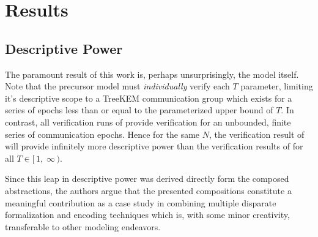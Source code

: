 \documentclass[authordraft,sigconf]{acmart}
\newcommand{\NumericRangeOpenR}[2]{\ensuremath{[\,#1,\; #2\,)}\xspace}
\begin{document}
\section{Results}

\subsection{Descriptive Power\label{sec:descriptive-power}}

The paramount result of this work is, perhaps unsurprisingly, the model  itself.
Note that the precursor model  must \emph{individually} verify each $T$ parameter, limiting it's descriptive scope to a TreeKEM communication group which exists for a series of epochs less than or equal to the parameterized upper bound of $T$.
In contrast, all verification runs of  provide verification for an unbounded, finite series of communication epochs.
Hence for the same $N$, the verification result of  will provide infinitely more descriptive power than the verification results of  for all $T \in \NumericRangeOpenR{1}{\infty}$. %

Since this leap in descriptive power was derived directly form the composed abstractions, the authors argue that the presented compositions constitute a meaningful contribution as a case study in combining multiple disparate formalization and encoding techniques which is, with some minor creativity, transferable to other modeling endeavors.
\end{document}
